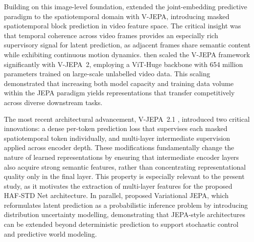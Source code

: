 Building on this image-level foundation, \citet{bardes2024vjepa} extended the joint-embedding predictive paradigm to the spatiotemporal domain with V-JEPA, introducing masked spatiotemporal block prediction in video feature space. The critical insight was that temporal coherence across video frames provides an especially rich supervisory signal for latent prediction, as adjacent frames share semantic content while exhibiting continuous motion dynamics. \citet{assran2025vjepa2} then scaled the V-JEPA framework significantly with V-JEPA~2, employing a ViT-Huge backbone with 654 million parameters trained on large-scale unlabelled video data. This scaling demonstrated that increasing both model capacity and training data volume within the JEPA paradigm yields representations that transfer competitively across diverse downstream tasks.

The most recent architectural advancement, V-JEPA~2.1 \citep{murlabadia2026vjepa21}, introduced two critical innovations: a dense per-token prediction loss that supervises each masked spatiotemporal token individually, and multi-layer intermediate supervision applied across encoder depth. These modifications fundamentally change the nature of learned representations by ensuring that intermediate encoder layers also acquire strong semantic features, rather than concentrating representational quality only in the final layer. This property is especially relevant to the present study, as it motivates the extraction of multi-layer features for the proposed HAF-STD Net architecture. In parallel, \citet{huang2026vjepa} proposed Variational JEPA, which reformulates latent prediction as a probabilistic inference problem by introducing distribution uncertainty modelling, demonstrating that JEPA-style architectures can be extended beyond deterministic prediction to support stochastic control and predictive world modeling.

